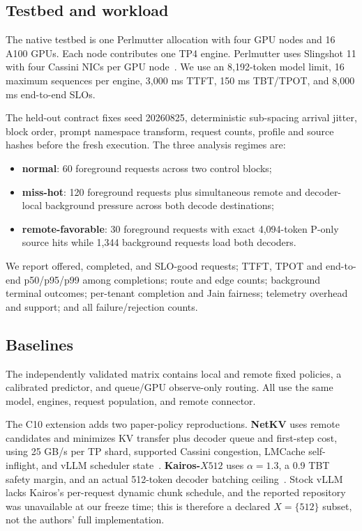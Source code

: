 \documentclass[10pt,twocolumn]{article}
\begin{document}
\subsection{Testbed and workload}

The native testbed is one Perlmutter allocation with four GPU nodes and 16 A100
GPUs.  Each node contributes one TP4 engine.  Perlmutter uses Slingshot 11 with
four Cassini NICs per GPU node~\cite{perlmutter}.  We use an 8,192-token model
limit, 16 maximum sequences per engine, 3,000 ms TTFT, 150 ms TBT/TPOT, and
8,000 ms end-to-end SLOs.

The held-out contract fixes seed 20260825, deterministic sub-spacing arrival
jitter, block order, prompt namespace transform, request counts, profile and
source hashes before the fresh execution.  The three analysis regimes are:

\begin{itemize}
  \item \textbf{normal}: 60 foreground requests across two control blocks;
  \item \textbf{miss-hot}: 120 foreground requests plus simultaneous remote
  and decoder-local background pressure across both decode destinations;
  \item \textbf{remote-favorable}: 30 foreground requests with exact
  4,094-token P-only source hits while 1,344 background requests load both
  decoders.
\end{itemize}

We report offered, completed, and SLO-good requests; TTFT, TPOT and end-to-end
p50/p95/p99 among completions; route and edge counts; background terminal
outcomes; per-tenant completion and Jain fairness; telemetry overhead and
support; and all failure/rejection counts.

\subsection{Baselines}

The independently validated matrix contains local and remote fixed policies,
a calibrated predictor, and queue/GPU observe-only routing.  All use the same
model, engines, request population, and remote connector.

The C10 extension adds two paper-policy reproductions.  \textbf{NetKV} uses
remote candidates and minimizes KV transfer plus decoder queue and first-step
cost, using 25 GB/s per TP shard, supported Cassini congestion, LMCache
self-inflight, and vLLM scheduler state~\cite{netkv}.  \textbf{Kairos-$X512$}
uses $\alpha=1.3$, a 0.9 TBT safety margin, and an actual 512-token decoder
batching ceiling~\cite{kairos}.  Stock vLLM lacks Kairos's per-request dynamic
chunk schedule, and the reported repository was unavailable at our freeze
time; this is therefore a declared $X=\{512\}$ subset, not the authors' full
implementation.
\end{document}
